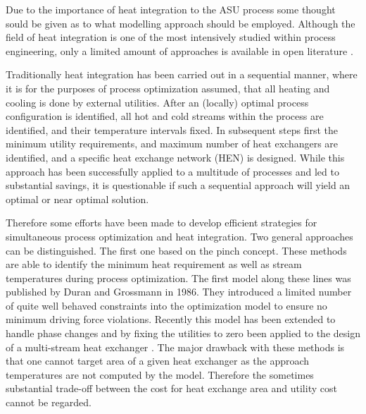     Due to the importance of heat integration to the ASU process some thought sould be given as to what modelling approach
    should be employed. Although the field of heat integration is one of the most intensively studied within process engineering,
    only  a limited amount of approaches is available in open literature \cite{Kamath.2012}.

    Traditionally heat integration has been carried out in a sequential manner, where it is for the purposes of process
    optimization assumed, that all heating and cooling is done by external utilities. After an (locally) optimal
    process configuration is identified, all hot and cold streams within the process are identified, and their
    temperature intervals fixed. %
    In subsequent steps first the minimum utility requirements, and maximum number of heat exchangers are identified,
    and a specific heat exchange network (HEN) is designed.
    While this approach has been successfully applied to a multitude of processes and led to substantial savings,
    it is questionable if such a sequential approach will yield an optimal or near optimal solution.

    Therefore some efforts have been made to develop efficient strategies for simultaneous process optimization
    and heat integration. Two general approaches can be distinguished. The first one based on the pinch concept.
     These methods are able to identify the minimum heat requirement
    as well as stream temperatures during process optimization. The first model along these lines was published
    by Duran and Grossmann \cite{Duran.1986} in 1986. They introduced a limited number of quite well behaved
    constraints into the optimization model to ensure no minimum driving force violations. Recently
    this model has been extended to handle phase changes and by fixing the utilities to zero been applied
    to the design of a multi-stream heat exchanger \cite{Kamath.2012}. The major drawback with these methods
    is that one cannot target area of a given heat exchanger as the approach temperatures are not computed
    by the model. Therefore the sometimes substantial trade-off between the cost for heat exchange area
    and utility cost cannot be regarded.

